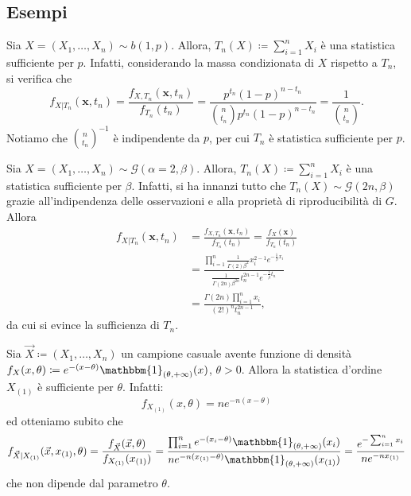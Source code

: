 \subsection{Esempi} 


\begin{ese}
  Sia \(X = (X_1,\dotsc,X_n) \sim b(1,p)\).
  Allora, \(T_n(X)\coloneqq \sum_{i=1}^n X_i\) è una statistica sufficiente per \(p\). Infatti, considerando la massa condizionata di \(X\) rispetto a \(T_n\), si verifica che
  \begin{equation*}
    f_{X|T_n}(\mathbf{x},t_n) = \frac{f_{X,T_n}(\mathbf{x},t_n)}{f_{T_n}(t_n)} =
    \frac{p^{t_n}(1-p)^{n-t_n}}{\binom{n}{t_n}p^{t_n}(1-p)^{n-t_n}} =
    \frac{1}{\binom{n}{t_n}}.
  \end{equation*}
  Notiamo che \(\binom{n}{t_n}^{-1}\) è indipendente da \(p\), per cui \(T_n\) è statistica sufficiente per \(p\).
\end{ese}

\begin{ese}
  Sia \(X = (X_1,\dotsc,X_n) \sim \mathcal{G}(\alpha=2,\beta)\). Allora, \(T_n(X)\coloneqq \sum_{i=1}^n X_i\) è una statistica sufficiente per \(\beta\).
  Infatti, si ha innanzi tutto che \(T_n(X)\sim \mathcal{G}(2n,\beta)\) grazie all'indipendenza delle osservazioni e alla proprietà di riproducibilità di \(G\). Allora
  \begin{equation*}\begin{split}
    f_{X|T_n}(\mathbf{x},t_n) &= \frac{f_{X,T_n}(\mathbf{x},t_n)}{f_{T_n}(t_n)} = \frac{f_{X}(\mathbf{x})}{f_{T_n}(t_n)} \\
    &= \frac{\prod_{i=1}^n \frac{1}{\Gamma(2)\beta^2}x_i^{2-1}e^{-\frac{1}{\beta}x_i}}{\frac{1}{\Gamma(2n)\beta^{2n}}t_n^{2n-1}e^{-\frac{1}{\beta}t_n}} \\
    &=\frac{\Gamma(2n)\prod_{i=1}^n x_i}{{(2!)}^n t_n^{2n-1}},
  \end{split}
\end{equation*}
  da cui si evince la sufficienza di \(T_n\).
\end{ese}

\begin{ese}
Sia $\vec{X}\coloneqq (X_1,\ldots,X_n)$ un campione casuale avente funzione di densità $f_X(x,\theta)\coloneqq e^{-(x-\theta)}\mathbbm{1}_{(\theta, +\infty)}(x)$, $\theta>0$. 
Allora la statistica d'ordine $X_{(1)}$ è sufficiente per \(\theta\). Infatti: 
$$f_{X_{(1)}}(x,\theta)=ne^{-n(x-\theta)}$$ ed otteniamo subito che $$f_{\vec{X} | X_{(1)}}(\vec{x},x_{(1)},\theta)=\frac{f_{\vec{X}}(\vec{x},\theta)}{f_{X_{(1)}}(x_{(1)})}=\frac{\prod_{i=1}^n e^{-(x_i-\theta)}\mathbbm{1}_{(\theta,+\infty)}(x_i)}{ne^{-n(x_{(1)}-\theta)}\mathbbm{1}_{(\theta,+\infty)}(x_{(1)})}=\frac{e^{-\sum_{i=1}^n x_i}}{ne^{-nx_{(1)}}}$$ che non dipende dal parametro \(\theta\).
\end{ese}

